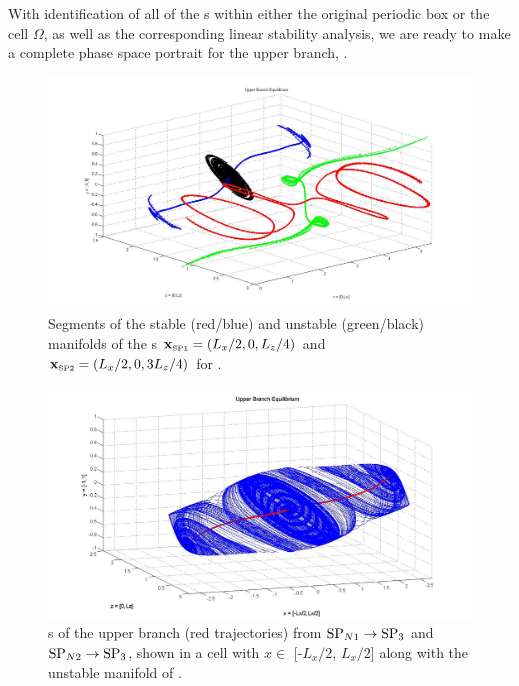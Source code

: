 \documentclass[lineno]{jfm}
\begin{document}
With identification of all of the {\stagp}s within either the original 
periodic box or the cell $\Omega$, as well as the corresponding linear 
stability analysis, we are ready to make a complete phase space portrait 
for the upper branch, {\tEQtwo}.

\begin{figure}[!h]
\includegraphics[width=1.0\textwidth]{manifolds_both.jpg}
  \caption{
   Segments of the stable (red/blue) and unstable (green/black) manifolds of the \stagp s
   $\xSP{1} = (L_x/2,0,L_z/4)$ and
   $\xSP{2} = (L_x/2,0,3L_z/4)$ for {\tEQtwo}. 
   }
  \label{fig:manifolds_both}
 \end{figure}


    \begin{figure}[!h]
\includegraphics[width=1.0\textwidth]{man14_june3.jpg}
  \caption{
{\Hec}s of the upper branch (red trajectories) from 
${{\text{SP}_{N1}}} \to {\ensuremath{{\text{SP}_{3}}}}$ and ${{\text{SP}_{N2}}} \to {\ensuremath{{\text{SP}_{3}}}}$, shown in a cell with $x \in$ 
[-$L_x/2$, $L_x/2$] along with the unstable manifold of . 
   }
  \label{fig:hetero1}
 \end{figure}
\end{document}
